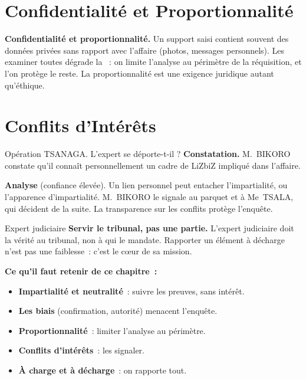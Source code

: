 \section{Confidentialité et Proportionnalité}
\label{sec:c03-confid}

\begin{boxCRO}
\textbf{Confidentialité et proportionnalité.} Un support saisi contient
souvent des données privées sans rapport avec l'affaire (photos, messages
personnels). Les examiner toutes dégrade la ~: on limite
l'analyse au périmètre de la réquisition, et l'on protège le reste. La
proportionnalité est une exigence juridique autant qu'éthique.
\end{boxCRO}

\section{Conflits d'Intérêts}
\label{sec:c03-conflits}

\begin{boxscenario}{Opération TSANAGA. L'expert se déporte-t-il ?}
\textbf{Constatation.} M.~BIKORO constate qu'il connaît personnellement un
cadre de LiZbiZ impliqué dans l'affaire.

\medskip
\textbf{Analyse} (confiance élevée). Un lien personnel peut entacher
l'impartialité, ou l'apparence d'impartialité. M.~BIKORO le signale au
parquet et à Me~TSALA, qui décident de la suite. La transparence sur les
conflits protège l'enquête.
\end{boxscenario}

\begin{boxmetier}{Expert judiciaire}
\textbf{Servir le tribunal, pas une partie.} L'expert judiciaire doit la
vérité au tribunal, non à qui le mandate. Rapporter un élément à décharge
n'est pas une faiblesse~: c'est le cœur de sa mission.
\end{boxmetier}

\separateur

\begin{boxresume}
\textbf{Ce qu'il faut retenir de ce chapitre~:}
\begin{itemize}
    \item \textbf{Impartialité et neutralité}~: suivre les preuves, sans
          intérêt.
    \item \textbf{Les biais} (confirmation, autorité) menacent l'enquête.
    \item \textbf{Proportionnalité}~: limiter l'analyse au périmètre.
    \item \textbf{Conflits d'intérêts}~: les signaler.
    \item \textbf{À charge et à décharge}~: on rapporte tout.
\end{itemize}
\end{boxresume}

